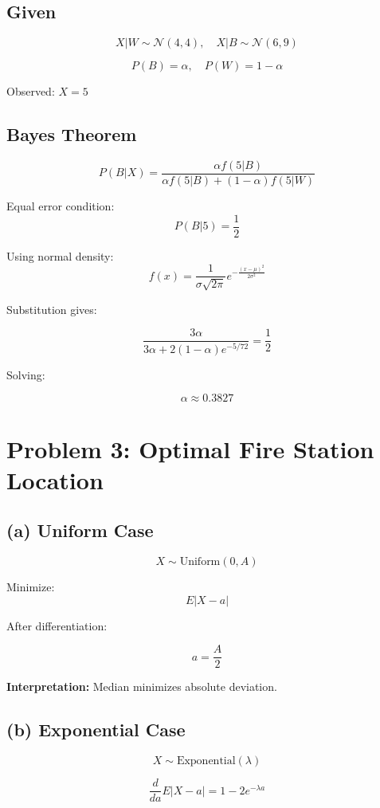 \documentclass[11pt]{article}
\begin{document}
\subsection*{Given}

\[
X|W \sim \mathcal{N}(4,4), \quad X|B \sim \mathcal{N}(6,9)
\]

\[
P(B)=\alpha, \quad P(W)=1-\alpha
\]

Observed: $X=5$

\subsection*{Bayes Theorem}

\[
P(B|X) =
\frac{\alpha f(5|B)}
{\alpha f(5|B)+(1-\alpha)f(5|W)}
\]

Equal error condition:
\[
P(B|5)=\frac12
\]

Using normal density:
\[
f(x)=\frac{1}{\sigma\sqrt{2\pi}}
e^{-\frac{(x-\mu)^2}{2\sigma^2}}
\]

Substitution gives:

\[
\frac{3\alpha}{3\alpha+2(1-\alpha)e^{-5/72}}
=\frac12
\]

Solving:

\[
\boxed{\alpha \approx 0.3827}
\]

\section{Problem 3: Optimal Fire Station Location}

\subsection*{(a) Uniform Case}

\[
X \sim \text{Uniform}(0,A)
\]

Minimize:
\[
E|X-a|
\]

After differentiation:

\[
\boxed{a = \frac{A}{2}}
\]

\textbf{Interpretation:} Median minimizes absolute deviation.

\subsection*{(b) Exponential Case}

\[
X \sim \text{Exponential}(\lambda)
\]

\[
\frac{d}{da}E|X-a|=1-2e^{-\lambda a}
\]
\end{document}

